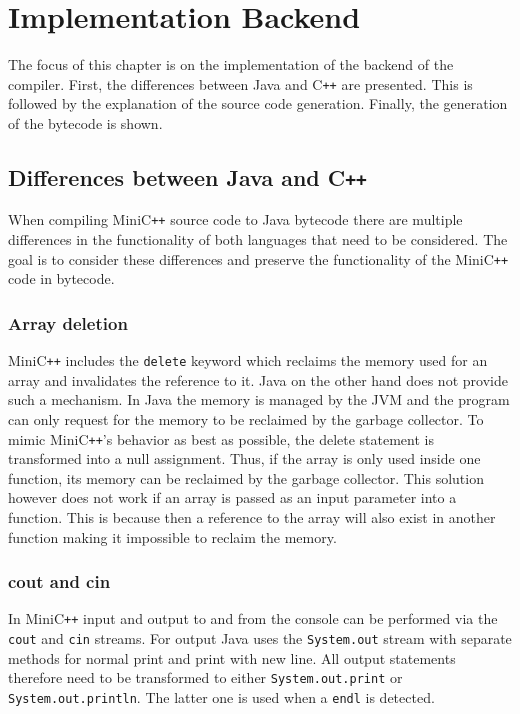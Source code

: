 \chapter{Implementation Backend}

The focus of this chapter is on the implementation of the backend of the compiler. First, the differences between Java and C\verb|++| are presented. This is followed by the explanation of the source code generation. Finally, the generation of the bytecode is shown.

\section{Differences between Java and C\texttt{++}}

When compiling MiniC\verb|++| source code to Java bytecode there are multiple differences in the functionality of both languages that need to be considered. The goal is to consider these differences and preserve the functionality of the MiniC\verb|++| code in bytecode. 

\subsection{Array deletion}

MiniC\verb|++| includes the \verb|delete| keyword which reclaims the memory used for an array and invalidates the reference to it. Java on the other hand does not provide such a mechanism. In Java the memory is managed by the JVM and the program can only request for the memory to be reclaimed by the garbage collector. To mimic MiniC\verb|++|'s behavior as best as possible, the delete statement is transformed into a null assignment. Thus, if the array is only used inside one function, its memory can be reclaimed by the garbage collector. This solution however does not work if an array is passed as an input parameter into a function. This is because then a reference to the array will also exist in another function making it impossible to reclaim the memory.  

\subsection{cout and cin}

In MiniC\verb|++| input and output to and from the console can be performed via the \verb|cout| and \verb|cin| streams. For output Java uses the \verb|System.out| stream with separate methods for normal print and print with new line. All output statements therefore need to be transformed to either \verb|System.out.print| or \verb|System.out.println|. The latter one is used when a \verb|endl| is detected. 

